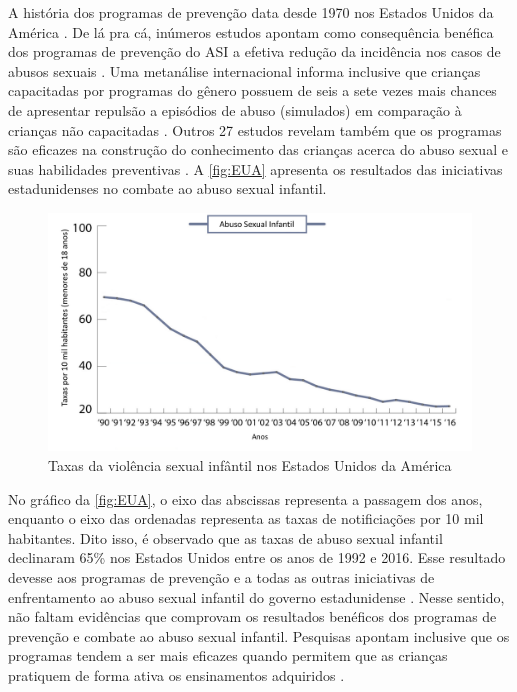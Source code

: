 A história dos programas de prevenção data desde 1970 nos Estados Unidos da América \cite{plummer1999history}. De lá pra cá, inúmeros estudos apontam como consequência benéfica dos programas de prevenção do ASI a efetiva redução da incidência nos casos de abusos sexuais \cite{maria2010papel}. Uma metanálise internacional informa inclusive que crianças capacitadas por programas do gênero possuem de seis a sete vezes mais chances de apresentar repulsão a episódios de abuso (simulados) em comparação à crianças não capacitadas \cite{finkelhor2009prevention}. Outros 27 estudos revelam também que os programas são eficazes na construção do conhecimento das crianças acerca do abuso sexual e suas habilidades preventivas \cite{collin2013lessons}. A \autoref{fig:EUA} apresenta os resultados das iniciativas estadunidenses no combate ao abuso sexual infantil.

\begin{figure}[htb]
  \caption{\label{fig:EUA}Taxas da violência sexual infântil nos Estados Unidos da América}
  \vspace{-0.2 cm}
  \begin{center}
    \includegraphics[width=\linewidth]{./Figuras/EUA.pdf}
  \end{center}
  \vspace{-0.8 cm}
\end{figure}

No gráfico da \autoref{fig:EUA}, o eixo das abscissas representa a passagem dos anos, enquanto o eixo das ordenadas representa as taxas de notificiações por 10 mil habitantes. Dito isso, é observado que as taxas de abuso sexual infantil declinaram 65\% nos Estados Unidos entre os anos de 1992 e 2016. Esse resultado devesse aos programas de prevenção e a todas as outras iniciativas de enfrentamento ao abuso sexual infantil do governo estadunidense \cite{mendelson2015parent}. Nesse sentido, não faltam evidências que comprovam os resultados benéficos dos programas de prevenção e combate ao abuso sexual infantil. Pesquisas apontam inclusive que os programas tendem a ser mais eficazes quando  permitem que as crianças pratiquem de forma ativa os ensinamentos adquiridos \cite{collin2013lessons}.

